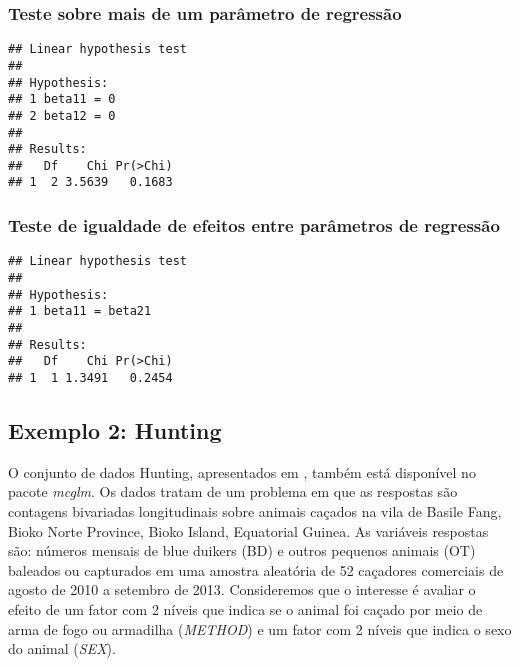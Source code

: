 \subsubsection{Teste sobre mais de um parâmetro de regressão}

\begin{knitrout}
\color{fgcolor}\begin{kframe}
\begin{alltt}
\hlstd{(} 
                      \hlstd{=} \hlstd{(}\hlstd{,}
                                    \hlstd{))}
\end{alltt}
\begin{verbatim}
## Linear hypothesis test
## 
## Hypothesis:            
## 1 beta11 = 0
## 2 beta12 = 0
## 
## Results:
##   Df    Chi Pr(>Chi)
## 1  2 3.5639   0.1683
\end{verbatim}
\end{kframe}
\end{knitrout}

\subsubsection{Teste de igualdade de efeitos entre parâmetros de regressão}

\begin{knitrout}
\color{fgcolor}\begin{kframe}
\begin{alltt}
\hlstd{(} 
                      \hlstd{=} \hlstd{(}\hlstd{))}
\end{alltt}
\begin{verbatim}
## Linear hypothesis test
## 
## Hypothesis:                 
## 1 beta11 = beta21
## 
## Results:
##   Df    Chi Pr(>Chi)
## 1  1 1.3491   0.2454
\end{verbatim}
\end{kframe}
\end{knitrout}


\subsection{Exemplo 2: Hunting}

O conjunto de dados Hunting, apresentados em \citet{hunting}, também está disponível no pacote \emph{mcglm}. Os dados tratam de um problema em que as respostas são contagens bivariadas longitudinais sobre animais caçados na vila de Basile Fang, Bioko Norte Province, Bioko Island, Equatorial Guinea. As variáveis respostas são: números mensais de blue duikers (BD) e outros pequenos animais (OT) baleados ou capturados em uma amostra aleatória de 52 caçadores comerciais de agosto de 2010 a setembro de 2013. Consideremos que o interesse é avaliar o efeito de um fator com 2 níveis que indica se o animal foi caçado por meio de arma de fogo ou armadilha (\emph{METHOD}) e um fator com 2 níveis que indica o sexo do animal (\emph{SEX}).

